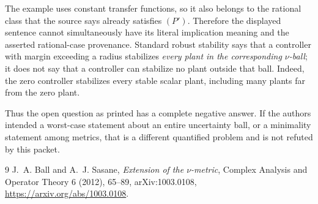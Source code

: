 \documentclass[11pt]{article}
\begin{document}
The example uses constant transfer functions, so it also belongs to the
rational class that the source says already satisfies $(P')$.  Therefore the
displayed sentence cannot simultaneously have its literal implication
meaning and the asserted rational-case provenance.  Standard robust
stability says that a controller with margin exceeding a radius stabilizes
\emph{every plant in the corresponding $\nu$-ball}; it does not say that a
controller can stabilize no plant outside that ball.  Indeed, the zero
controller stabilizes every stable scalar plant, including many plants far
from the zero plant.

Thus the open question as printed has a complete negative answer.  If the
authors intended a worst-case statement about an entire uncertainty ball, or
a minimality statement among metrics, that is a different quantified problem
and is not refuted by this packet.

\begin{thebibliography}{9}
J.~A. Ball and A.~J. Sasane,
\emph{Extension of the $\nu$-metric},
Complex Analysis and Operator Theory 6 (2012), 65--89,
arXiv:1003.0108,
\url{https://arxiv.org/abs/1003.0108}.
\end{thebibliography}
\end{document}
